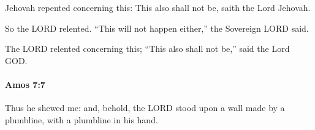 			\begin{versebox}
					\item[BHS] 
					\item[LXX] 
					\item[ASV] Jehovah repented concerning this: This also shall not be, saith the Lord Jehovah.
					\item[NIV] So the LORD relented. “This will not happen either,” the Sovereign LORD said.
					\item[NRSV] The LORD relented concerning this; “This also shall not be,” said the Lord GOD.
			\end{versebox}

		\paragraph{Amos 7:7} %
			\label{AMOS-7-7}

			Thus he shewed me: and, behold, the LORD stood upon a wall made by a plumbline, with a plumbline in his hand.

